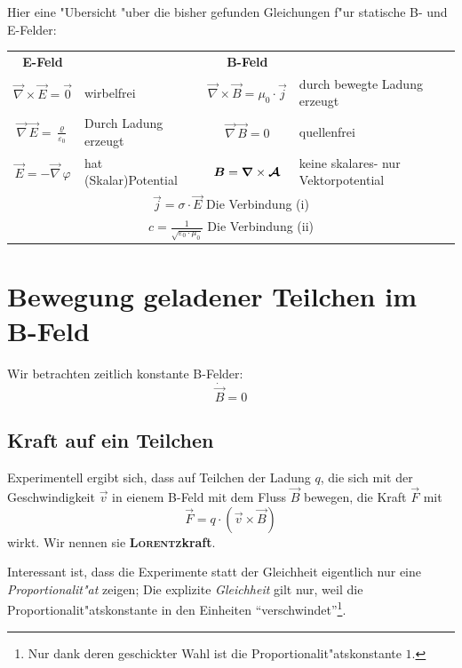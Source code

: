 Hier eine "Ubersicht "uber die bisher gefunden Gleichungen f"ur statische
B- und E-Felder:
\begin{center}
\begin{tabular}[c]{c l cl }
   \textbf{E-Feld} & ~ &\textbf{B-Feld} & ~ \\
   $\vec \nabla \times \vec E = \vec 0$ & wirbelfrei & $\vec \nabla \times \vec B =
   \mu_0 \cdot \vec j$ & durch bewegte Ladung erzeugt\\
   $\vec \nabla \, \vec E = \frac{\varrho}{\varepsilon_0}$ & Durch
   Ladung erzeugt & $\vec
   \nabla\,\vec B = 0$ & quellenfrei \\
   $\vec E = - \vec \nabla\,\varphi$ & hat (Skalar)Potential & $\boldsymbol{B} = \boldsymbol{\nabla} \times
   \boldsymbol{\mathcal{A}}$ & keine skalares- nur Vektorpotential\\
   \multicolumn{4}{c}{$\vec j = \sigma \cdot \vec E$ Die Verbindung (i)}\\
   \multicolumn{4}{c}{$c = \frac{1}{\sqrt{\varepsilon_0 \cdot \mu_0}}$
     Die Verbindung (ii)}
\end{tabular}
\end{center}









\section{Bewegung geladener Teilchen im B-Feld}
\label{kap_bewegung-geladener-teilchen-im-b}

Wir betrachten zeitlich konstante B-Felder:
 $$\dot{ \vec B } = 0$$




\subsection{Kraft auf ein Teilchen}
\label{kap_kraft-auf-ein-teilchen}

Experimentell ergibt sich, dass auf Teilchen der Ladung $q$, die sich
mit der Geschwindigkeit $\vec v$ in eienem B-Feld  mit dem Fluss $\vec
B$ bewegen, die Kraft $\vec F$ mit
\begin{equation}
   \label{eqn_kraft_in_bfeld}
\boxed{\vec F = q \cdot \left (\vec v \times \vec B \right )}
\end{equation}
wirkt. 
Wir nennen sie \textbf{\textsc{Lorentz}kraft}.

Interessant ist, dass die Experimente statt der Gleichheit eigentlich
nur eine \emph{Proportionalit"at} zeigen; Die explizite
\emph{Gleichheit} gilt nur, weil die Proportionalit"atskonstante in den
Einheiten "`verschwindet"'\footnote{Nur dank deren geschickter Wahl ist die
Proportionalit"atskonstante $1$.}.

